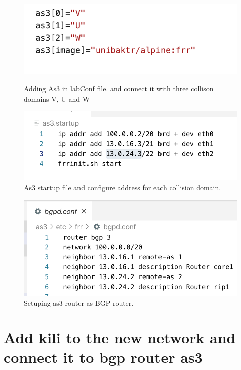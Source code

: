 \begin{figure}[H]
  \centering
  \begin{minipage}[b]{0.45\textwidth}
    \includegraphics[width=\textwidth]{Images/as3 LapConf.png}
    \caption{Adding As3 in labConf file. and connect it with three collison domains V, U and W}
  \end{minipage}
  \hfill
  \begin{minipage}[b]{0.45\textwidth}
    \includegraphics[width=\textwidth]{Images/as3Setup.png}
    \caption{As3 startup file and configure address for each collision domain.}
  \end{minipage}
\end{figure}
\begin{figure}[H]
\centering
 \includegraphics[width=\textwidth]{Images/as3BGPD.png}
 \caption{Setuping as3 router as BGP router.}
  \label{fig:2.4}
\end{figure}


\section{Add kili to the new network and connect it to bgp router as3}

